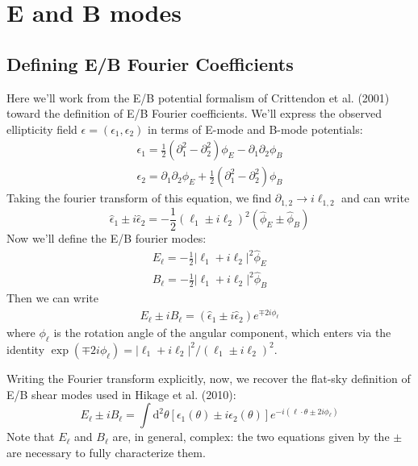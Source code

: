 \documentclass[12pt]{article}			%
\begin{document}
\section*{E and B modes}
\subsection{Defining E/B Fourier Coefficients}
Here we'll work from the E/B potential formalism of Crittendon et al. (2001)
toward the definition of E/B Fourier coefficients.
We'll express the observed ellipticity field 
$\epsilon = (\epsilon_1,\epsilon_2)$ in terms of E-mode and B-mode potentials:
\begin{eqnarray}
  \epsilon_1 = \frac{1}{2}(\partial_1^2 - \partial_2^2)\phi_E - \partial_1\partial_2\phi_B \nonumber \\
  \epsilon_2 = \partial_1\partial_2\phi_E + \frac{1}{2}(\partial_1^2 - \partial_2^2)\phi_B 
\end{eqnarray}
Taking the fourier transform of this equation, we find
$\partial_{1,2} \to i\ell_{1,2}$ and can write
\begin{equation}
  \hat\epsilon_1 \pm i\hat\epsilon_2 = 
  -\frac{1}{2}(\ell_1\pm i\ell_2)^2(\hat\phi_E \pm \hat\phi_B)
\end{equation}
Now we'll define the E/B fourier modes:
\begin{eqnarray}
  E_\ell = -\frac{1}{2}|\ell_1 + i\ell_2|^2\hat\phi_E \nonumber\\
  B_\ell = -\frac{1}{2}|\ell_1 + i\ell_2|^2\hat\phi_B 
\end{eqnarray}
Then we can write
\begin{eqnarray}
  \label{EB_fourier}
  E_\ell \pm iB_\ell = (\hat\epsilon_1 \pm i\hat\epsilon_2)e^{\mp 2i\phi_\ell}
\end{eqnarray}
where $\phi_\ell$ is the rotation angle of the angular component, which enters
via the identity 
$\exp(\mp 2i\phi_\ell) = |\ell_1 + i\ell_2|^2/(\ell_1\pm i\ell_2)^2$.

Writing the Fourier transform explicitly, now, we recover the flat-sky
definition of E/B shear modes used in Hikage et al. (2010):
\begin{equation}
  \label{EB_full}
  E_\ell \pm iB_\ell = \int \mathrm{d}^2\theta 
  [\epsilon_1(\theta) \pm i\epsilon_2(\theta) ]
  e^{-i(\ell\cdot\theta \pm 2i\phi_\ell)}
\end{equation}
Note that $E_\ell$ and $B_\ell$ are, in general, complex: the two equations
given by the $\pm$ are necessary to fully characterize them.
\end{document}
